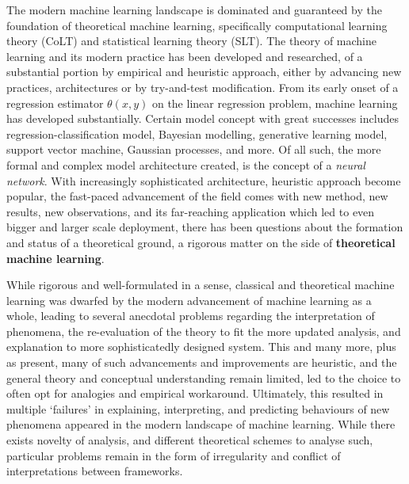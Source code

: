 \documentclass[
  journal=largetwo,
  simfonts=false,
  year=2025,
  volume=37,
]{cup-journal}
\begin{document}
The modern machine learning landscape is dominated and guaranteed by the foundation of theoretical machine learning, specifically computational learning theory (CoLT) and statistical learning theory (SLT). The theory of machine learning and its modern practice has been developed and researched, of a substantial portion by empirical and heuristic approach, either by advancing new practices, architectures or by try-and-test modification. From its early onset of a regression estimator $\theta(x,y)$ on the linear regression problem, machine learning has developed substantially. Certain model concept with great successes includes regression-classification model, Bayesian modelling, generative learning model, support vector machine, Gaussian processes, and more. Of all such, the more formal and complex model architecture created, is the concept of a \textit{neural network}. With increasingly sophisticated architecture, heuristic approach become popular, the fast-paced advancement of the field comes with new method, new results, new observations, and its far-reaching application which led to even bigger and larger scale deployment, there has been questions about the formation and status of a theoretical ground, a rigorous matter on the side of \textbf{theoretical machine learning}.

While rigorous and well-formulated in a sense, classical and theoretical machine learning was dwarfed by the modern advancement of machine learning as a whole, leading to several anecdotal problems regarding the interpretation of phenomena, the re-evaluation of the theory to fit the more updated analysis, and explanation to more sophisticatedly designed system. This and many more, plus as present, many of such advancements and improvements are heuristic, and the general theory and conceptual understanding remain limited, led to the choice to often opt for analogies and empirical workaround. Ultimately, this resulted in multiple `failures' in explaining, interpreting, and predicting behaviours of new phenomena appeared in the modern landscape of machine learning. While there exists novelty of analysis, and different theoretical schemes to analyse such, particular problems remain in the form of irregularity and conflict of interpretations between frameworks. 
\end{document}
